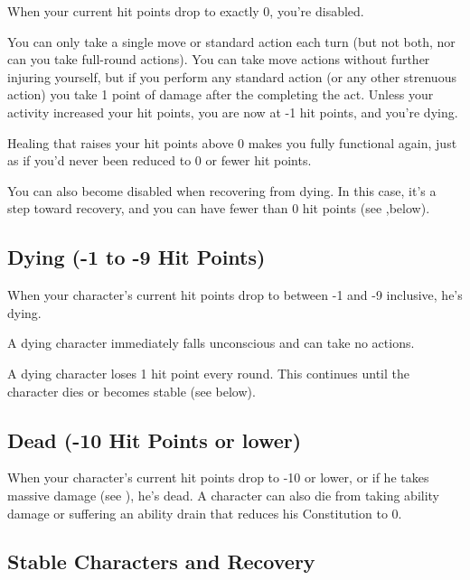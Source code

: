 When your current hit points drop to exactly 0, you're disabled.

You can only take a single move or standard action each turn (but not both, nor can you take full-round actions). You can take move actions without further injuring yourself, but if you perform any standard action (or any other strenuous action) you take 1 point of damage after the completing the act. Unless your activity increased your hit points, you are now at -1 hit points, and you're dying.

Healing that raises your hit points above 0 makes you fully functional again, just as if you'd never been reduced to 0 or fewer hit points.

You can also become disabled when recovering from dying. In this case, it's a step toward recovery, and you can have fewer than 0 hit points (see 
,below).

\subsection{Dying (-1 to -9 Hit Points)}

When your character's current hit points drop to between -1 and -9 inclusive, he's dying.

A dying character immediately falls unconscious and can take no actions.

A dying character loses 1 hit point every round. This continues until the character dies or becomes stable (see below).

\subsection{Dead (-10 Hit Points or lower)}

When your character's current hit points drop to -10 or lower, or if he takes massive damage (see ), he's dead. A character can also die from taking ability damage or suffering an ability drain that reduces his Constitution to 0.

\subsection{Stable Characters and Recovery}

